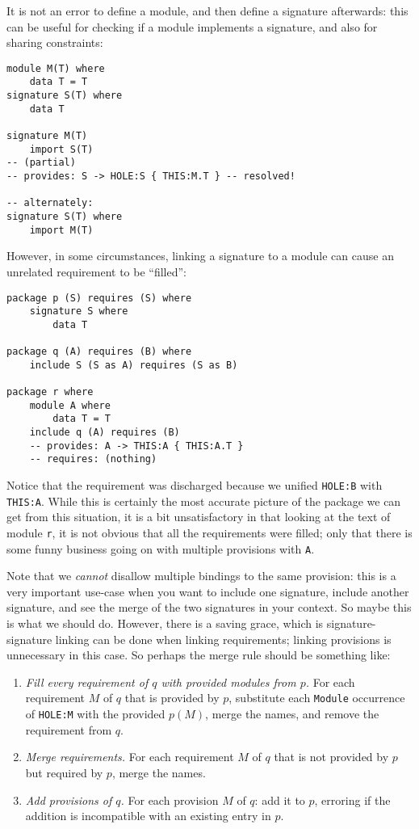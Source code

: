 \documentclass{article}
\newcommand{\Red}[1]{{\color{red} #1}}
\begin{document}
It is not an error to define a module, and then define a signature
afterwards: this can be useful for checking if a module implements
a signature, and also for sharing constraints:

\begin{verbatim}
module M(T) where
    data T = T
signature S(T) where
    data T

signature M(T)
    import S(T)
-- (partial)
-- provides: S -> HOLE:S { THIS:M.T } -- resolved!

-- alternately:
signature S(T) where
    import M(T)
\end{verbatim}

However, in some circumstances, linking a signature to a module can cause an
unrelated requirement to be ``filled'':

\begin{verbatim}
package p (S) requires (S) where
    signature S where
        data T

package q (A) requires (B) where
    include S (S as A) requires (S as B)

package r where
    module A where
        data T = T
    include q (A) requires (B)
    -- provides: A -> THIS:A { THIS:A.T }
    -- requires: (nothing)
\end{verbatim}

Notice that the requirement was discharged because we unified \verb|HOLE:B|
with \verb|THIS:A|.  While this is certainly the most accurate picture
of the package we can get from this situation, it is a bit unsatisfactory
in that looking at the text of module \verb|r|, it is not obvious that
all the requirements were filled; only that there is some funny business
going on with multiple provisions with \verb|A|.

Note that we \emph{cannot} disallow multiple bindings to the same provision:
this is a very important use-case when you want to include one signature,
include another signature, and see the merge of the two signatures in your
context.  \Red{So maybe this is what we should do.}  However, there is
a saving grace, which is signature-signature linking can be done when
linking requirements; linking provisions is unnecessary in this case.
So perhaps the merge rule should be something like:

\begin{enumerate}
    \item \emph{Fill every requirement of $q$ with provided modules from
        $p$.} For each requirement $M$ of $q$ that is provided by $p$,
        substitute each \verb|Module| occurrence of \verb|HOLE:M| with the
        provided $p(M)$, merge the names, and remove the requirement from $q$.
    \item \emph{Merge requirements.}  For each requirement $M$ of $q$ that is not
        provided by $p$ but required by $p$, merge the names.
    \item \emph{Add provisions of $q$.} For each provision $M$ of $q$:
        add it to $p$, erroring if the addition is incompatible with an
        existing entry in $p$.
\end{enumerate}
\end{document}
